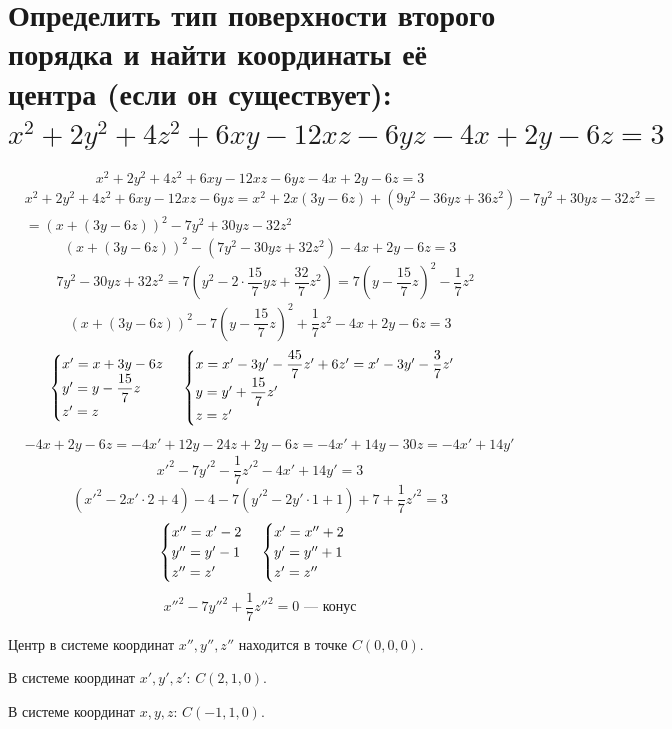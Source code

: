 \documentclass[12pt]{article}
\begin{document}
\section{Определить тип поверхности второго порядка и найти координаты её центра (если он существует): $x^2 + 2y^2 + 4z^2 + 6xy - 12xz - 6yz - 4x + 2y - 6z = 3$}
\[
    x^2 + 2y^2 + 4z^2 + 6xy - 12xz - 6yz - 4x + 2y - 6z = 3
\]
\begin{align*}
     & x^2 + 2y^2 + 4z^2 + 6xy - 12xz - 6yz = x^2 + 2x (3y - 6z) + (9y^2 - 36yz + 36z^2) - 7y^2 + 30yz - 32z^2 = \\
     & = (x + (3y - 6z))^2 - 7y^2 + 30yz - 32z^2
\end{align*}
\[
    (x + (3y - 6z))^2 - (7y^2 - 30yz + 32z^2) - 4x + 2y - 6z = 3
\]
\begin{align*}
     & 7y^2 - 30yz + 32z^2 = 7(y^2 - 2 \cdot \dfrac{15}{7}yz + \dfrac{32}{7}z^2) = 7(y - \dfrac{15}{7}z)^2 - \dfrac{1}{7}z^2
\end{align*}
\[
    (x + (3y - 6z))^2 - 7(y - \dfrac{15}{7}z)^2 + \dfrac{1}{7}z^2 - 4x + 2y - 6z = 3
\]
\[
    \begin{cases}
        x' = x + 3y - 6z        \\
        y' = y - \dfrac{15}{7}z \\
        z' = z
    \end{cases}
    \\
    \begin{cases}
        x = x' - 3y' - \dfrac{45}{7}z' + 6z' = x' - 3y' - \dfrac{3}{7}z' \\
        y = y' + \dfrac{15}{7}z'                                         \\
        z = z'
    \end{cases}
\]
\begin{align*}
     & -4x + 2y - 6z = -4x' + 12y - 24z + 2y - 6z = -4x' + 14y - 30z = -4x' + 14y'
\end{align*}
\[
    {x'}^2 - 7{y'}^2 - \dfrac{1}{7}{z'}^2 - 4x' + 14y' = 3
\]
\[
    ({x'}^2 - 2 x'\cdot 2 + 4) - 4 - 7({y'}^2 - 2 y' \cdot 1 + 1) + 7 + \dfrac{1}{7}{z'}^2 = 3
\]
\[
    \begin{cases}
        x'' = x' - 2 \\
        y'' = y' - 1 \\
        z'' = z'
    \end{cases}
    \\
    \begin{cases}
        x' = x'' + 2 \\
        y' = y'' + 1 \\
        z' = z''
    \end{cases}
\]
\[
    {x''}^2 - 7{y''}^2 + \dfrac{1}{7}{z''}^2 = 0 \text{ — конус}
\]

Центр в системе координат $x'', y'', z''$ находится в точке $C(0, 0, 0)$.

В системе координат $x', y', z'$: $C(2, 1, 0)$.

В системе координат $x, y, z$: $C(-1,1,0)$.

\end{document}
